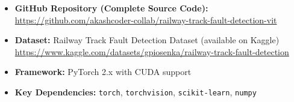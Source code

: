 \documentclass[10pt,twocolumn,letterpaper]{article}
\begin{document}
\begin{itemize}
    \item \textbf{GitHub Repository (Complete Source Code):}\\
    \url{https://github.com/akashcoder-collab/railway-track-fault-detection-vit}
    \item \textbf{Dataset:} Railway Track Fault Detection Dataset (available on Kaggle)\\
    \url{https://www.kaggle.com/datasets/gpiosenka/railway-track-fault-detection}
    \item \textbf{Framework:} PyTorch 2.x with CUDA support
    \item \textbf{Key Dependencies:} \texttt{torch}, \texttt{torchvision}, \texttt{scikit-learn}, \texttt{numpy}
\end{itemize}
\end{document}
